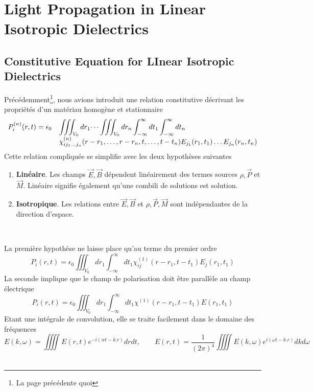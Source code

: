 \chapter{Light Propagation in Linear Isotropic Dielectrics	}
\section{Constitutive Equation for LInear Isotropic Dielectrics}
Précédemment\footnote{La page précédente quoi}, nous avions introduit une relation constitutive décrivant les
propriétés d'un matériau homogène et stationnaire
	\begin{equation}
	\begin{array}{ll}
	\displaystyle P_i^{(n)}(r,t) =\epsilon_0&\displaystyle\iiint_{V_0}dr_1\dots \iiint_{V_0} dr_n \int_{-\infty}^
	\infty dt_1\int_{-\infty}^	\infty dt_n\\
	&\displaystyle \chi_{ij_1\dots j_n}^{(n)}(r-r_1,\dots,r-r_n,t,\dots,t-t_n)E_{j_1}(r_1,t_1)\dots
	E_{j_n}(r_n,t_n)
	\end{array}
	\end{equation}
Cette relation compliquée se simplifie avec les deux hypothèses suivantes
\begin{enumerate}
\item \textbf{Linéaire}. Les champs $\vec E, \vec{B}$ dépendent linéairement des termes sources $\rho,\vec P$ 
et $\vec M$. Linéaire signifie également qu'une combili de solutions est solution. 
\item \textbf{Isotropique}. Les relations entre $\vec E, \vec{B}$ et $\rho,\vec P, \vec M$ sont indépendantes
de la direction d'espace.
\end{enumerate}\ 
	
La première hypothèse ne laisse place qu'au terme du premier ordre
\begin{equation}
P_i(r,t) = \epsilon_0\iiint_{V_0} dr_1\int_{-\infty}^\infty dt_1\chi_{ij}^{(1)}(r-r_1,t-t_1)E_j(r_1,t_1)
\end{equation}
La seconde implique que le champ de polarisation doit être parallèle au champ électrique
\begin{equation}
P_i(r,t) = \epsilon_0\iiint_{V_0} dr_1\int_{-\infty}^\infty dt_1\chi^{(1)}(r-r_1,t-t_1)E(r_1,t_1)
\end{equation}
Etant une intégrale de convolution, elle se traite facilement dans le domaine des fréquences
\begin{equation}
E(k,\omega) = \iiiint E(r,t)e^{-i(wt-k. r)}drdt,\qquad E(r,t) = \frac{1}{(2\pi)^4}\iiiint E(k,\omega)e^{
i(\omega t-k.r)}dkd\omega
\end{equation}\ 

